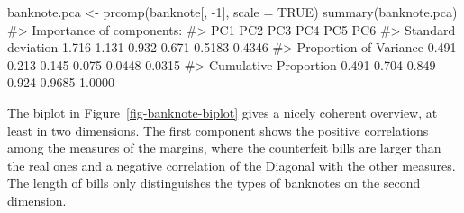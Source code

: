 \documentclass[
  letterpaper,
  10pt,
  krantz2]{krantz}
\makeatletter
\newenvironment{Shaded}{\begin{snugshade}}{\end{snugshade}}
\newcommand{\AttributeTok}[1]{\textcolor[rgb]{0.40,0.45,0.13}{#1}}
\newcommand{\CommentTok}[1]{\textcolor[rgb]{0.37,0.37,0.37}{#1}}
\newcommand{\ConstantTok}[1]{\textcolor[rgb]{0.56,0.35,0.01}{#1}}
\newcommand{\DecValTok}[1]{\textcolor[rgb]{0.68,0.00,0.00}{#1}}
\newcommand{\FloatTok}[1]{\textcolor[rgb]{0.68,0.00,0.00}{#1}}
\newcommand{\FunctionTok}[1]{\textcolor[rgb]{0.28,0.35,0.67}{#1}}
\newcommand{\NormalTok}[1]{\textcolor[rgb]{0.00,0.23,0.31}{#1}}
\newcommand{\OtherTok}[1]{\textcolor[rgb]{0.00,0.23,0.31}{#1}}
\newcommand{\SpecialCharTok}[1]{\textcolor[rgb]{0.37,0.37,0.37}{#1}}
\newcommand{\StringTok}[1]{\textcolor[rgb]{0.13,0.47,0.30}{#1}}
\newenvironment{kframe}{%
  \medskip{}
  \setlength{\fboxsep}{.8em}
  \def\at@end@of@kframe{}%
  \ifinner\ifhmode%
  \def\at@end@of@kframe{\end{minipage}}%
  \begin{minipage}{\columnwidth}%
  \fi\fi%
  \def\FrameCommand##1{\hskip\@totalleftmargin \hskip-\fboxsep
  \colorbox{shadecolor}{##1}\hskip-\fboxsep
      \hskip-\linewidth \hskip-\@totalleftmargin \hskip\columnwidth}%
  \MakeFramed {\advance\hsize-\width
    \@totalleftmargin\z@ \linewidth\hsize
    \@setminipage}}%
{\par\unskip\endMakeFramed%
  \at@end@of@kframe}
\renewenvironment{Shaded}{\begin{kframe}}{\end{kframe}}
\makeatother
\begin{document}
\begin{Shaded}
\begin{Highlighting}[]
\NormalTok{banknote.pca }\OtherTok{\textless{}{-}} \FunctionTok{prcomp}\NormalTok{(banknote[, }\SpecialCharTok{{-}}\DecValTok{1}\NormalTok{], }\AttributeTok{scale =} \ConstantTok{TRUE}\NormalTok{)}
\FunctionTok{summary}\NormalTok{(banknote.pca)}
\CommentTok{\#\textgreater{} Importance of components:}
\CommentTok{\#\textgreater{}                          PC1   PC2   PC3   PC4    PC5    PC6}
\CommentTok{\#\textgreater{} Standard deviation     1.716 1.131 0.932 0.671 0.5183 0.4346}
\CommentTok{\#\textgreater{} Proportion of Variance 0.491 0.213 0.145 0.075 0.0448 0.0315}
\CommentTok{\#\textgreater{} Cumulative Proportion  0.491 0.704 0.849 0.924 0.9685 1.0000}
\end{Highlighting}
\end{Shaded}

The biplot in Figure~\ref{fig-banknote-biplot} gives a nicely coherent
overview, at least in two dimensions. The first component shows the
positive correlations among the measures of the margins, where the
counterfeit bills are larger than the real ones and a negative
correlation of the Diagonal with the other measures. The length of bills
only distinguishes the types of banknotes on the second dimension.

\begin{Shaded}
\end{Shaded}
\end{document}
